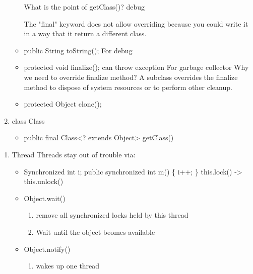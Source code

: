 \documentclass[11pt]{article}
\begin{document}
\begin{enumerate}
\begin{itemize}
What is the point of getClass()?
debug

The "final" keyword does not allow overriding because you could write it in
a way that it return a different class.

\item public String toString();
For debug

\item protected void finalize(); can throw exception
For garbage collector
Why we need to override finalize method?
A subclass overrides the finalize method to dispose of system resources or
to perform other cleanup.

\item protected Object clone();
\end{itemize}

\item class Class
\begin{itemize}
\item public final Class<? extends Object> getClass()
\end{itemize}
\end{enumerate}


\begin{enumerate}
\item Thread
Threads stay out of trouble via:
\begin{itemize}
\item Synchronized
int i;
public synchronized int m() \{ i++; \}
this.lock() -> this.unlock()
\item Object.wait()
\begin{enumerate}
\item remove all synchronized locks held by this thread
\item Wait until the object beomes available
\end{enumerate}

\item Object.notify()
\begin{enumerate}
\item wakes up one thread
\end{enumerate}
\end{itemize}
\end{enumerate}
\end{document}
